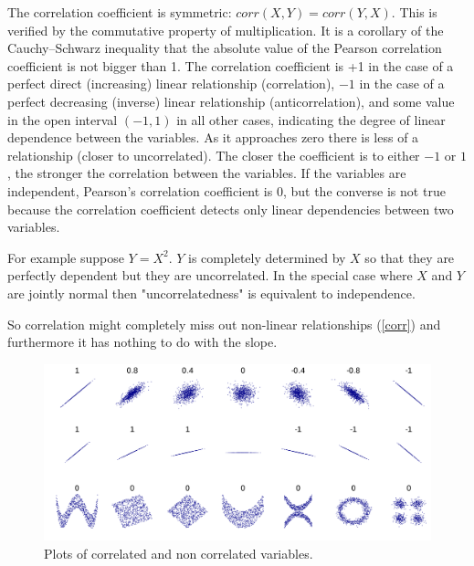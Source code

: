 \documentclass[12pt, letterpaper]{article}
\theoremstyle{definition}
\begin{document}
The correlation coefficient is symmetric: $corr(X,Y)=corr (Y,X)$. This is verified by the commutative property of multiplication.
It is a corollary of the Cauchy–Schwarz inequality that the absolute value of the Pearson correlation coefficient is not bigger than 1. The correlation coefficient is +1 in the case of a perfect direct (increasing) linear relationship (correlation), $-1$ in the case of a perfect decreasing (inverse) linear relationship (anticorrelation), and some value in the open interval 
$(-1,1)$ in all other cases, indicating the degree of linear dependence between the variables. As it approaches zero there is less of a relationship (closer to uncorrelated). The closer the coefficient is to either $-1$ or $1$, the stronger the correlation between the variables.
If the variables are independent, Pearson's correlation coefficient is $0$, but the converse is not true because the correlation coefficient detects only linear dependencies between two variables.

For example suppose $Y=X^2$. $Y$ is completely determined by $X$ so that they are perfectly dependent but they are uncorrelated.
In the special case where $X$ and $Y$ are jointly normal then "uncorrelatedness" is equivalent to independence.

So correlation might completely miss out non-linear relationships (\autoref{corr}) and furthermore it has nothing to do with the slope.
\begin{figure}
\centering
\includegraphics[scale=0.137]{img/corr}
\caption{Plots of correlated and non correlated variables.}
\label{corr}
\end{figure}
\end{document}
